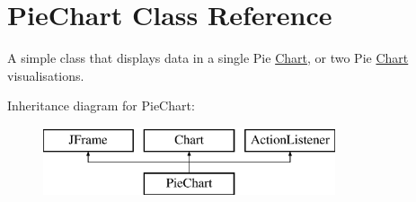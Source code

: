 \hypertarget{class_pie_chart}{\section{Pie\-Chart Class Reference}
\label{class_pie_chart}
}


A simple class that displays data in a single Pie \hyperlink{interface_chart}{Chart}, or two Pie \hyperlink{interface_chart}{Chart} visualisations.  


Inheritance diagram for Pie\-Chart\-:\begin{figure}[H]
\begin{center}
\leavevmode
\includegraphics[height=2.000000cm]{class_pie_chart}
\end{center}
\end{figure}
